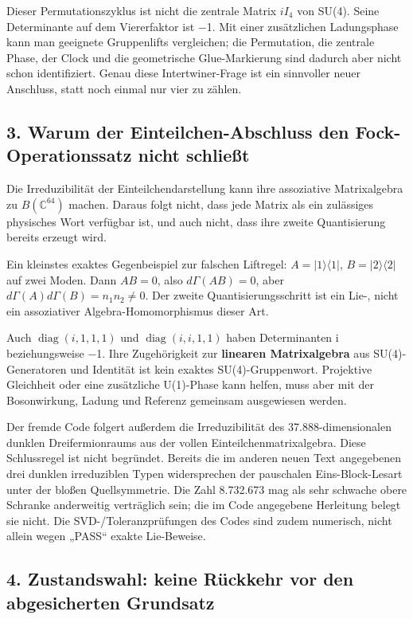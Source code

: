Dieser Permutationszyklus ist nicht die zentrale Matrix \(iI_4\) von
SU(4). Seine Determinante auf dem Viererfaktor ist −1. Mit einer
zusätzlichen Ladungsphase kann man geeignete Gruppenlifts vergleichen;
die Permutation, die zentrale Phase, der Clock und die geometrische
Glue-Markierung sind dadurch aber nicht schon identifiziert. Genau diese
Intertwiner-Frage ist ein sinnvoller neuer Anschluss, statt noch einmal
nur vier zu zählen.

\subsection{3. Warum der Einteilchen-Abschluss den Fock-Operationssatz
nicht
schließt}\label{warum-der-einteilchen-abschluss-den-fock-operationssatz-nicht-schlieuxdft}

Die Irreduzibilität der Einteilchendarstellung kann ihre assoziative
Matrixalgebra zu \(B(\mathbb C^{64})\) machen. Daraus folgt nicht, dass
jede Matrix als ein zulässiges physisches Wort verfügbar ist, und auch
nicht, dass ihre zweite Quantisierung bereits erzeugt wird.

Ein kleinstes exaktes Gegenbeispiel zur falschen Liftregel:
\(A=|1\rangle\langle1|\), \(B=|2\rangle\langle2|\) auf zwei Moden. Dann
\(AB=0\), also \(d\Gamma(AB)=0\), aber
\(d\Gamma(A)d\Gamma(B)=n_1n_2\ne0\). Der zweite Quantisierungsschritt
ist ein Lie-, nicht ein assoziativer Algebra-Homomorphismus dieser Art.

Auch \(\operatorname{diag}(i,1,1,1)\) und
\(\operatorname{diag}(i,i,1,1)\) haben Determinanten i beziehungsweise
−1. Ihre Zugehörigkeit zur \textbf{linearen Matrixalgebra} aus
SU(4)-Generatoren und Identität ist kein exaktes SU(4)-Gruppenwort.
Projektive Gleichheit oder eine zusätzliche U(1)-Phase kann helfen, muss
aber mit der Bosonwirkung, Ladung und Referenz gemeinsam ausgewiesen
werden.

Der fremde Code folgert außerdem die Irreduzibilität des
37.888-dimensionalen dunklen Dreifermionraums aus der vollen
Einteilchenmatrixalgebra. Diese Schlussregel ist nicht begründet.
Bereits die im anderen neuen Text angegebenen drei dunklen irreduziblen
Typen widersprechen der pauschalen Eins-Block-Lesart unter der bloßen
Quellsymmetrie. Die Zahl 8.732.673 mag als sehr schwache obere Schranke
anderweitig verträglich sein; die im Code angegebene Herleitung belegt
sie nicht. Die SVD-/Toleranzprüfungen des Codes sind zudem numerisch,
nicht allein wegen „PASS`` exakte Lie-Beweise.

\subsection{4. Zustandswahl: keine Rückkehr vor den abgesicherten
Grundsatz}\label{zustandswahl-keine-ruxfcckkehr-vor-den-abgesicherten-grundsatz}

